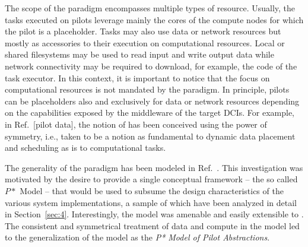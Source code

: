 \documentclass{sig-alternate}
\begin{document}
The scope of the \pilot paradigm encompasses multiple types of resource.
Usually, the tasks executed on pilots leverage mainly the cores of the
compute nodes for which the pilot is a placeholder. Tasks may also use
data or network resources but mostly as accessories to their execution
on computational resources. Local or shared filesystems may be used to
read input and write output data while network connectivity may be
required to download, for example, the code of the task executor. In
this context, it is important to notice that the focus on computational
resources is not mandated by the \pilot paradigm. In principle, pilots
can be placeholders also and exclusively for data or network resources
depending on the capabilities exposed by the middleware of the target
DCIs. For example, in Ref.~[pilot data], the notion of \pilotdata has
been conceived using the power of symmetry, i.e., \pilotdata taken to be
a notion as fundamental to dynamic data placement and scheduling as
\pilot is to computational tasks.

The generality of the \pilot paradigm has been modeled in
Ref.~\cite{Luckow:2008la}. This investigation was motivated by the
desire to provide a single conceptual framework -- the so called $P*$
Model -- that would be used to subsume the design characteristics of the
various \pilot system implementations, a sample of which have been
analyzed in detail in Section~\ref{sec:4}.  Interestingly, the \pstar model was
amenable and easily extensible to \pilotdata.  The consistent and
symmetrical treatment of data and compute in the model led to the
generalization of the model as the {\it P* Model of Pilot Abstractions}.

\end{document}
